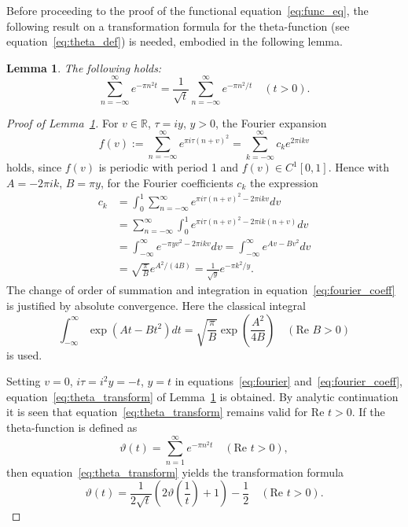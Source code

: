 \documentclass[11pt]{article}
\newtheorem{lemma}[theorem]{Lemma}
\begin{document}
Before proceeding to the proof of the functional equation~\eqref{eq:func_eq}, the following result on a transformation formula for the theta-function (see equation~\eqref{eq:theta_def}) is needed, embodied in the following lemma.

\begin{lemma}\label{lem:theta_transform}
The following holds:
\begin{equation}\label{eq:theta_transform}
\sum_{n=-\infty}^{\infty} e^{-\pi n^2 t} = \frac{1}{\sqrt{t}} \sum_{n=-\infty}^{\infty} e^{-\pi n^2/t} \quad (t > 0).
\end{equation}
\end{lemma}

\begin{proof}[Proof of Lemma~\ref{lem:theta_transform}]
For $v \in \mathbb{R}$, $\tau = iy$, $y > 0$, the Fourier expansion
\begin{equation}\label{eq:fourier}
f(v) := \sum_{n=-\infty}^{\infty} e^{\pi i \tau (n+v)^2} = \sum_{k=-\infty}^{\infty} c_k e^{2\pi ikv}
\end{equation}
holds, since $f(v)$ is periodic with period 1 and $f(v) \in C^1[0,1]$. Hence with $A = -2\pi ik$, $B = \pi y$, for the Fourier coefficients $c_k$ the expression
\begin{align}\label{eq:fourier_coeff}
c_k &= \int_0^1 \sum_{n=-\infty}^{\infty} e^{\pi i \tau (n+v)^2 - 2\pi ikv} dv \\
&= \sum_{n=-\infty}^{\infty} \int_0^1 e^{\pi i \tau (n+v)^2 - 2\pi ik(n+v)} dv \nonumber \\
&= \int_{-\infty}^{\infty} e^{-\pi yv^2 - 2\pi ikv} dv = \int_{-\infty}^{\infty} e^{Av - Bv^2} dv \nonumber \\
&= \sqrt{\frac{\pi}{B}} e^{A^2/(4B)} = \frac{1}{\sqrt{y}} e^{-\pi k^2/y}. \nonumber
\end{align}
The change of order of summation and integration in equation~\eqref{eq:fourier_coeff} is justified by absolute convergence. Here the classical integral
\begin{equation}\label{eq:gaussian_int}
\int_{-\infty}^{\infty} \exp(At - Bt^2) dt = \sqrt{\frac{\pi}{B}} \exp\left(\frac{A^2}{4B}\right) \quad (\text{Re } B > 0)
\end{equation}
is used.

Setting $v = 0$, $i\tau = i^2y = -t$, $y = t$ in equations~\eqref{eq:fourier} and~\eqref{eq:fourier_coeff}, equation~\eqref{eq:theta_transform} of Lemma~\ref{lem:theta_transform} is obtained. By analytic continuation it is seen that equation~\eqref{eq:theta_transform} remains valid for $\text{Re } t > 0$. If the theta-function is defined as
\begin{equation}\label{eq:theta_def}
\vartheta(t) = \sum_{n=1}^{\infty} e^{-\pi n^2 t} \quad (\text{Re } t > 0),
\end{equation}
then equation~\eqref{eq:theta_transform} yields the transformation formula
\begin{equation}\label{eq:theta_transform_alt}
\vartheta(t) = \frac{1}{2\sqrt{t}} \left( 2\vartheta\left(\frac{1}{t}\right) + 1 \right) - \frac{1}{2} \quad (\text{Re } t > 0).
\end{equation}
\end{proof}
\end{document}
